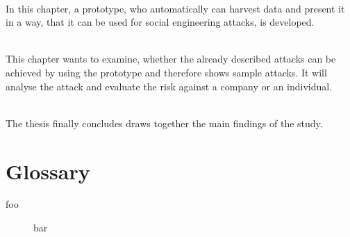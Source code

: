 \vspace{0.5em}\\
\noindent In this chapter, a prototype, who automatically can harvest data and
present it in a way, that it can be used for social engineering attacks, is
developed.

\vspace{0.5em}\\
\noindent This chapter wants to examine, whether the already described attacks
can be achieved by using the prototype and therefore shows sample attacks. It
will analyse the attack and evaluate the risk against a company or an
individual.

\vspace{0.5em}\\
\noindent The thesis finally concludes draws together the main findings of the
study.

\newpage

\section{Glossary}
\begin{multicols}{2}

\begin{description}
\item[foo] bar
\end{description}

\end{multicols}
